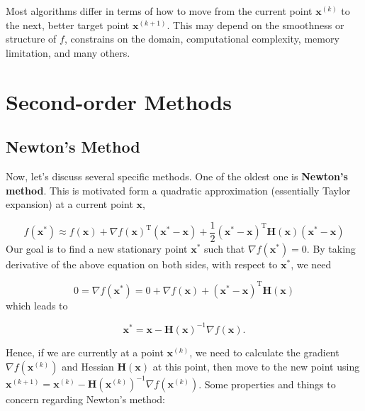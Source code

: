 \documentclass[
]{book}
\theoremstyle{definition}
\theoremstyle{definition}
\theoremstyle{definition}
\theoremstyle{definition}
\theoremstyle{remark}
\begin{document}
Most algorithms differ in terms of how to move from the current point \(\mathbf{x}^{(k)}\) to the next, better target point \(\mathbf{x}^{(k+1)}\). This may depend on the smoothness or structure of \(f\), constrains on the domain, computational complexity, memory limitation, and many others.

\hypertarget{second-order-methods}{%
\section{Second-order Methods}\label{second-order-methods}}

\hypertarget{newtons-method}{%
\subsection{Newton's Method}\label{newtons-method}}

Now, let's discuss several specific methods. One of the oldest one is \textbf{Newton's method}. This is motivated form a quadratic approximation (essentially Taylor expansion) at a current point \(\mathbf{x}\),

\[f(\mathbf{x}^\ast) \approx f(\mathbf{x}) + \nabla f(\mathbf{x})^\text{T}(\mathbf{x}^\ast - \mathbf{x}) + \frac{1}{2} (\mathbf{x}^\ast - \mathbf{x})^\text{T}\mathbf{H}(\mathbf{x}) (\mathbf{x}^\ast - \mathbf{x})\]
Our goal is to find a new stationary point \(\mathbf{x}^\ast\) such that \(\nabla f(\mathbf{x}^\ast) = 0\). By taking derivative of the above equation on both sides, with respect to \(\mathbf{x}^\ast\), we need

\[0 = \nabla f(\mathbf{x}^\ast) = 0 + \nabla f(\mathbf{x}) + (\mathbf{x}^\ast - \mathbf{x})^\text{T}\mathbf{H}(\mathbf{x})\]
which leads to

\[\mathbf{x}^\ast = \mathbf{x}-  \mathbf{H}(\mathbf{x})^{-1} \nabla f(\mathbf{x}).\]

Hence, if we are currently at a point \(\mathbf{x}^{(k)}\), we need to calculate the gradient \(\nabla f(\mathbf{x}^{(k)})\) and Hessian \(\mathbf{H}(\mathbf{x})\) at this point, then move to the new point using \(\mathbf{x}^{(k+1)} = \mathbf{x}^{(k)} - \mathbf{H}(\mathbf{x}^{(k)})^{-1} \nabla f(\mathbf{x}^{(k)})\). Some properties and things to concern regarding Newton's method:
\end{document}
